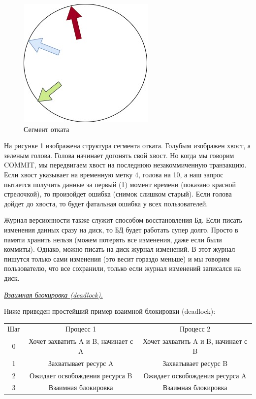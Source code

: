 \begin{figure}[H]
	\centering
	\includegraphics[scale = 0.5]{6/vers.jpg}
	\caption{Сегмент отката}
	\label{fig:vers}
	
\end{figure}

На рисунке \ref{fig:vers} изображена структура сегмента отката. Голубым изображен хвост, а зеленым голова. Голова начинает догонять свой хвост. Но когда мы говорим COMMIT, мы передвигаем хвост на последнюю незакоммиченную транзакцию. Если хвост указывает на временную метку 4, голова на 10, а наш запрос пытается получить данные за первый (1) момент времени (показано красной стрелочкой), то произойдет ошибка (снимок слишком старый). Если голова дойдет до хвоста, то будет фатальная ошибка у всех пользователей. 


Журнал версионности также служит способом восстановления Бд. Если писать изменения данных сразу на диск, то БД будет работать супер долго. Просто в памяти хранить нельзя (можем потерять все изменения, даже если были коммиты). Однако, можно писать на диск журнал изменений. В этот журнал пишутся только сами изменения (это весит гораздо меньше) и мы говорим пользователю, что все сохранили, только если журнал изменений записался на диск. 


\begin{center}
\textit{\underline{Взаимная блокировка (deadlock).}}
\end{center}

Ниже приведен простейший пример взаимной блокировки (deadlock):

\begin{center}
	\begin{tabular}{c|c | c}
		Шаг	& Процесс 1	& Процесс 2 \\
		0	&Хочет захватить A и B, начинает с A &	Хочет захватить A и B, начинает с B \\
		1&	Захватывает ресурс A &	Захватывает ресурс B \\
		2&	Ожидает освобождения ресурса B	& Ожидает освобождения ресурса A \\
		3	&Взаимная блокировка & Взаимная блокировка
	\end{tabular}
\end{center}

